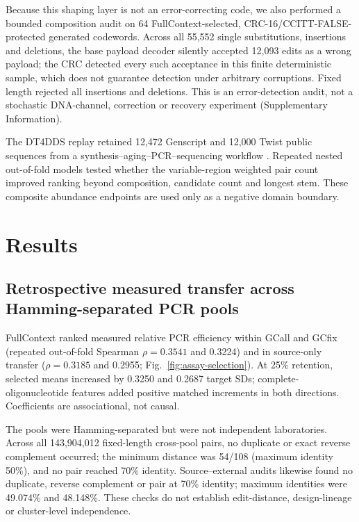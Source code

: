 \documentclass[unnumsec,webpdf,modern,large]{oup-authoring-template}
\begin{document}
Because this shaping layer is not an error-correcting code, we also performed a bounded composition audit on 64 FullContext-selected, CRC-16/CCITT-FALSE-protected generated codewords. Across all 55,552 single substitutions, insertions and deletions, the base payload decoder silently accepted 12,093 edits as a wrong payload; the CRC detected every such acceptance in this finite deterministic sample, which does not guarantee detection under arbitrary corruptions. Fixed length rejected all insertions and deletions. This is an error-detection audit, not a stochastic DNA-channel, correction or recovery experiment (Supplementary Information).

The DT4DDS replay retained 12,472 Genscript and 12,000 Twist public sequences from a synthesis--aging--PCR--sequencing workflow \cite{gimpel2023digitaltwin}. Repeated nested out-of-fold models tested whether the variable-region weighted pair count improved ranking beyond composition, candidate count and longest stem. These composite abundance endpoints are used only as a negative domain boundary.

\section{Results}

\subsection{Retrospective measured transfer across Hamming-separated PCR pools}

FullContext ranked measured relative PCR efficiency within GCall and GCfix (repeated out-of-fold Spearman $\rho=0.3541$ and 0.3224) and in source-only transfer ($\rho=0.3185$ and 0.2955; Fig.~\ref{fig:assay-selection}). At 25\% retention, selected means increased by 0.3250 and 0.2687 target SDs; complete-oligonucleotide features added positive matched increments in both directions. Coefficients are associational, not causal.

The pools were Hamming-separated but were not independent laboratories. Across all 143,904,012 fixed-length cross-pool pairs, no duplicate or exact reverse complement occurred; the minimum distance was 54/108 (maximum identity 50\%), and no pair reached 70\% identity. Source--external audits likewise found no duplicate, reverse complement or pair at 70\% identity; maximum identities were 49.074\% and 48.148\%. These checks do not establish edit-distance, design-lineage or cluster-level independence.
\end{document}

